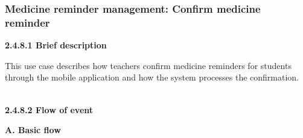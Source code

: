 \subsubsection{Medicine reminder management: Confirm medicine reminder}
\indent\indent\textbf{2.4.8.1 Brief description}
\vspace{0.5em}
\par\indent\indent\parbox{0.9\textwidth}{
    This use case describes how teachers confirm medicine reminders for students through the mobile application and how the system processes the confirmation.
}\\

\vspace{0.5em}
\indent\textbf{2.4.8.2 Flow of event}
\vspace{0.5em}
\par\indent\indent\textbf{A. Basic flow}
\vspace{-0.5em}
\renewcommand{\arraystretch}{1.5}
